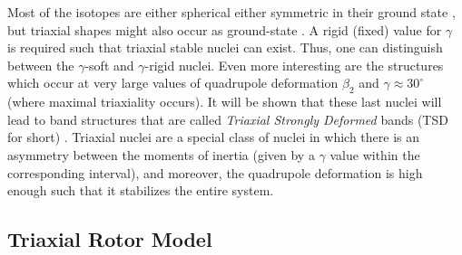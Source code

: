 Most of the isotopes are either spherical either symmetric in their ground state \cite{budaca2018tilted}, but triaxial shapes might also occur as ground-state \cite{moller2006global}.
A rigid (fixed) value for $\gamma$ is required such that triaxial stable nuclei can exist.
Thus, one can distinguish between the $\gamma$-soft and $\gamma$-rigid nuclei.
Even more interesting are the structures which occur at very large values of quadrupole deformation $\beta_2$ and $\gamma\approx 30^\circ$ (where maximal triaxiality occurs). It will be shown that these last nuclei will lead to band structures that are called \emph{Triaxial Strongly Deformed} bands (TSD for short) \cite{odegaard2001evidence,jensen2002evidence}. Triaxial nuclei are a special class of nuclei in which there is an asymmetry between the moments of inertia (given by a $\gamma$ value within the corresponding interval), and moreover, the quadrupole deformation is high enough such that it stabilizes the entire system.

\subsection{Triaxial Rotor Model}
\label{trm-model}

